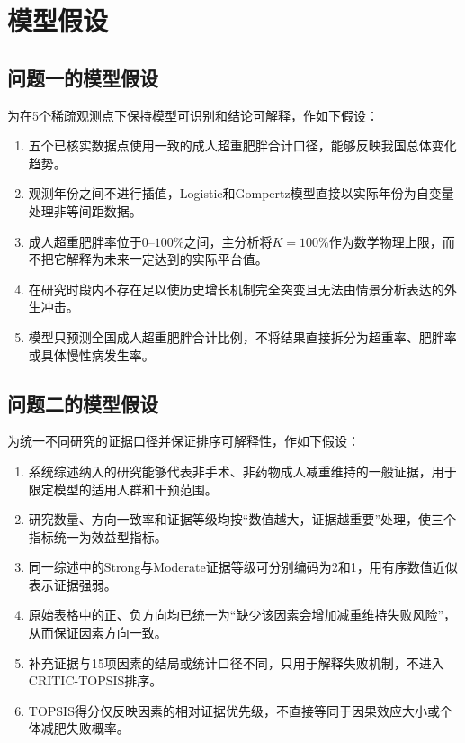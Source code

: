 \section{模型假设}

\subsection{问题一的模型假设}

为在5个稀疏观测点下保持模型可识别和结论可解释，作如下假设：

\begin{enumerate}[label=(\arabic*),leftmargin=2em]
  \item 五个已核实数据点使用一致的成人超重肥胖合计口径，能够反映我国总体变化趋势。
  \item 观测年份之间不进行插值，Logistic和Gompertz模型直接以实际年份为自变量处理非等间距数据。
  \item 成人超重肥胖率位于$0$--$100\%$之间，主分析将$K=100\%$作为数学物理上限，而不把它解释为未来一定达到的实际平台值。
  \item 在研究时段内不存在足以使历史增长机制完全突变且无法由情景分析表达的外生冲击。
  \item 模型只预测全国成人超重肥胖合计比例，不将结果直接拆分为超重率、肥胖率或具体慢性病发生率。
\end{enumerate}

\subsection{问题二的模型假设}

为统一不同研究的证据口径并保证排序可解释性，作如下假设：

\begin{enumerate}[label=(\arabic*),leftmargin=2em]
  \item 系统综述纳入的研究能够代表非手术、非药物成人减重维持的一般证据，用于限定模型的适用人群和干预范围。
  \item 研究数量、方向一致率和证据等级均按“数值越大，证据越重要”处理，使三个指标统一为效益型指标。
  \item 同一综述中的Strong与Moderate证据等级可分别编码为2和1，用有序数值近似表示证据强弱。
  \item 原始表格中的正、负方向均已统一为“缺少该因素会增加减重维持失败风险”，从而保证因素方向一致。
  \item 补充证据与15项因素的结局或统计口径不同，只用于解释失败机制，不进入CRITIC-TOPSIS排序。
  \item TOPSIS得分仅反映因素的相对证据优先级，不直接等同于因果效应大小或个体减肥失败概率。
\end{enumerate}

